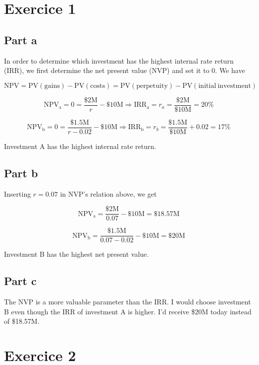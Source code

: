 \documentclass[a4paper,11pt,twoside]{article}
\def \be {\begin{equation}}
\def \ee {\end{equation}}
\begin{document}
\section*{Exercice 1}

\subsection*{Part a}

In order to determine which investment has the highest internal rate return (IRR), we first determine the net present value (NVP) and set it to 0. We have

\be
\mathrm{NPV} = \mathrm{PV(gains)} - \mathrm{PV(costs)} = 
\mathrm{PV(perpetuity)} - \mathrm{PV(initial\ investment)}
\ee

\be
\mathrm{NPV_a}=0=\frac{\$2\mathrm{M}}{r} - \$10\mathrm{M} \Rightarrow \mathrm{IRR_a}=r_a=\frac{\$2\mathrm{M}}{\$10\mathrm{M}}=20\%
\ee


\be
\mathrm{NPV_b}=0=\frac{\$1.5\mathrm{M}}{r-0.02} - \$10\mathrm{M} \Rightarrow \mathrm{IRR_b}=r_b=\frac{\$1.5\mathrm{M}}{\$10\mathrm{M}}+0.02=17\%
\ee

Investment A has the highest internal rate return.

\subsection*{Part b}

Inserting $r=0.07$ in  NVP's relation above, we get

\be
\mathrm{NPV_a}=\frac{\$2\mathrm{M}}{0.07} - \$10\mathrm{M}=\$18.57\mathrm{M}
\ee

\be
\mathrm{NPV_b}=\frac{\$1.5\mathrm{M}}{0.07-0.02} - \$10\mathrm{M}=\$20\mathrm{M}
\ee

Investment B has the highest net present value.

\subsection*{Part c}

The NVP is a more valuable parameter than the IRR. I would choose investment B even though the IRR of investment A is higher. I'd receive \$20M today instead of \$18.57M. 



\section*{Exercice 2}
\end{document}
